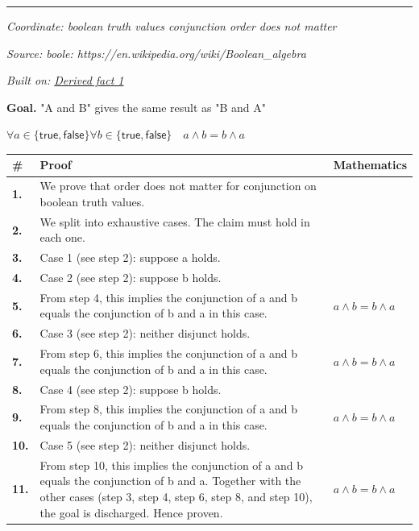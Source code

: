 \documentclass[11pt]{article}
\theoremstyle{definition}
\begin{document}
\label{thm:Bool-disjunction-order_does_not_matter}
\par\medskip\hrule
\bigskip
{}\par
\smallskip\noindent\textit{Coordinate: boolean truth values \cdot conjunction \cdot order does not matter}\par
\smallskip\noindent\textit{Source: boole: https://en.wikipedia.org/wiki/Boolean\_algebra}\par
\smallskip\noindent\textit{Built on: \hyperref[thm:Bool-disjunction-order_does_not_matter]{Derived fact 1}}\par
\medskip
\noindent\textbf{Goal.} "A and B" gives the same result as "B and A"\par
\noindent$\displaystyle \forall a \in \{\mathsf{true}, \mathsf{false}\} \forall b \in \{\mathsf{true}, \mathsf{false}\}\quad a \land b = b \land a$\par
\medskip
\noindent
\begin{tabular}{@{} >{\raggedright\arraybackslash}p{} >{\raggedright\arraybackslash}p{} >{\raggedleft\arraybackslash}p{} @{}}
\textbf{\#} & \textbf{Proof} & \textbf{Mathematics} \\
\midrule
\textbf{1.} & We prove that order does not matter for conjunction on boolean truth values. & \\[0.45em]
\textbf{2.} & We split into exhaustive cases. The claim must hold in each one. & \\[0.45em]
\textbf{3.} & Case 1 (see step 2): suppose a holds. & \\[0.45em]
\textbf{4.} & Case 2 (see step 2): suppose b holds. & \\[0.45em]
\textbf{5.} & From step 4, this implies the conjunction of a and b equals the conjunction of b and a in this case. & $\displaystyle a \land b = b \land a$ \\[0.45em]
\textbf{6.} & Case 3 (see step 2): neither disjunct holds. & \\[0.45em]
\textbf{7.} & From step 6, this implies the conjunction of a and b equals the conjunction of b and a in this case. & $\displaystyle a \land b = b \land a$ \\[0.45em]
\textbf{8.} & Case 4 (see step 2): suppose b holds. & \\[0.45em]
\textbf{9.} & From step 8, this implies the conjunction of a and b equals the conjunction of b and a in this case. & $\displaystyle a \land b = b \land a$ \\[0.45em]
\textbf{10.} & Case 5 (see step 2): neither disjunct holds. & \\[0.45em]
\textbf{11.} & From step 10, this implies the conjunction of a and b equals the conjunction of b and a. Together with the other cases (step 3, step 4, step 6, step 8, and step 10), the goal is discharged. Hence proven. & $\displaystyle a \land b = b \land a$ \\[0.45em]
\bottomrule
\end{tabular}
\end{document}
